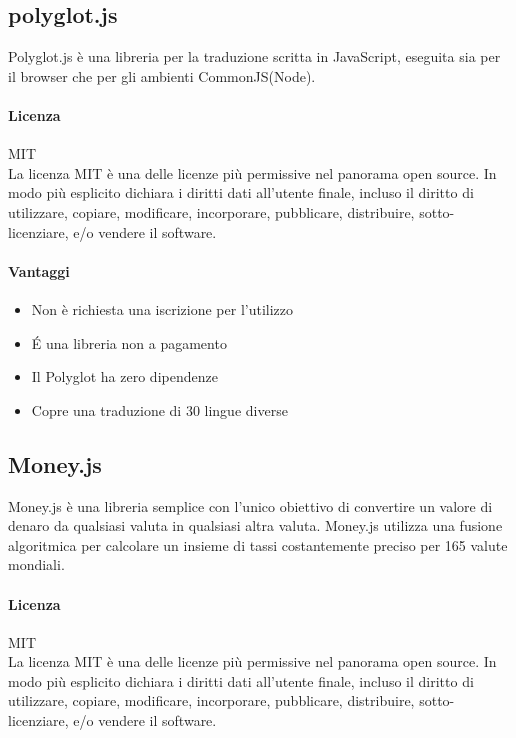 \subsection{polyglot.js}
Polyglot.js è una libreria per la traduzione scritta in JavaScript, eseguita sia per il browser che per gli ambienti CommonJS(Node).

\paragraph{Licenza} MIT \\
La licenza MIT è una delle licenze più permissive nel panorama open
source. In modo più esplicito dichiara i diritti dati all'utente
finale, incluso il diritto di utilizzare, copiare, modificare,
incorporare, pubblicare, distribuire, sotto-licenziare, e/o vendere il
software. \\

\paragraph{Vantaggi}
\begin{itemize}
	\item Non è richiesta una iscrizione per l'utilizzo
	\item \'E una libreria non a pagamento
	\item Il Polyglot ha zero dipendenze
	\item Copre una traduzione di 30 lingue diverse
\end{itemize}




\subsection{Money.js}

Money.js è una libreria semplice con l'unico obiettivo di convertire
un valore di denaro da qualsiasi valuta in qualsiasi altra
valuta. Money.js utilizza una fusione algoritmica per calcolare un
insieme di tassi costantemente preciso per 165 valute mondiali. 
 \\

\paragraph{Licenza} MIT \\
La licenza MIT è una delle licenze più permissive nel panorama open
source. In modo più esplicito dichiara i diritti dati all'utente
finale, incluso il diritto di utilizzare, copiare, modificare,
incorporare, pubblicare, distribuire, sotto-licenziare, e/o vendere il
software.\\ 

